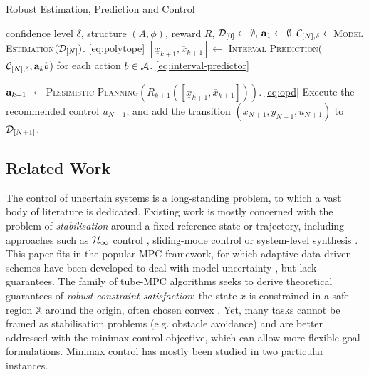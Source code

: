 \documentclass{article}
\begin{document}
\begin{algorithm}[tb]
	\caption{Robust Estimation, Prediction and Control}
	\label{alg:full}
	\begin{algorithmic}
		 confidence level $\delta$, structure $(A,\phi)$, reward $R$, $\mathcal{D}_{[0]}\gets\emptyset,\, \mathbf{a}_1\gets\emptyset$
		\STATE $\mathcal{C}_{[N],\delta} \gets$\textsc{Model Estimation}$(\mathcal{D}_{[N]})$. \eqref{eq:polytope}
		\STATE $[\underline{x}_{k+1}, \overline{x}_{k+1}]\gets$ \textsc{Interval Prediction}($\mathcal{C}_{[N],\delta}, \mathbf{a}_kb$) for each action $b\in \mathcal{A}$. \eqref{eq:interval-predictor}

		\STATE $\mathbf{a}_{k+1}$ $\gets$\textsc{Pessimistic Planning}$(\underline{R_{k+1}}([\underline{x}_{k+1}, \overline{x}_{k+1}]))$.  \eqref{eq:opd}
		\ENDFOR
		\STATE Execute the recommended control $u_{N+1}$, and add the transition $(x_{N+1}, y_{N+1}, u_{N+1})$ to $\mathcal{D}_{[N+1]}$.
		\ENDFOR
	\end{algorithmic}
\end{algorithm}

\subsection{Related Work}

The control of uncertain systems is a long-standing problem, to which a vast body of literature is dedicated. Existing work is mostly concerned with the problem of \emph{stabilisation} around a fixed reference state or trajectory, including approaches such as $\mathcal{H}_\infty$ control \citep[][]{Basar1996}, sliding-mode control \citep{Lu1997} or system-level synthesis \citep{Dean2017,Dean2018}. This paper fits in the popular MPC framework, for which adaptive data-driven schemes have been developed to deal with model uncertainty \citep{Sastry1990,Tanaskovic2014,Amos2018}, but lack guarantees. The family of tube-MPC algorithms seeks to derive theoretical guarantees of \emph{robust constraint satisfaction}: the state $x$ is constrained in a safe region $\mathbb{X}$ around the origin, often chosen convex \citep{Fukushima2007,Adetola2009,Aswani2013,Turchetta2016,Lorenzen2017,Kohler2019,Lu2019}. %
Yet, many tasks cannot be framed as stabilisation problems (e.g. obstacle avoidance) and are better addressed with the minimax control objective, which can allow more flexible goal formulations. Minimax control has mostly been studied in two particular instances.
\end{document}
